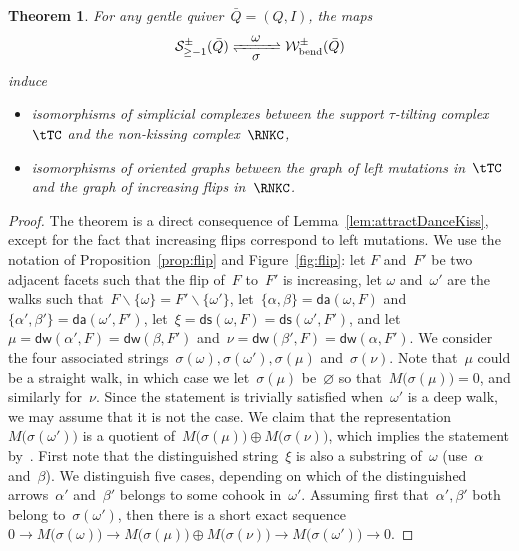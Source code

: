 \documentclass{amsart}
\newtheorem{theorem}{Theorem}[part]
\theoremstyle{definition}
\newcommand{\ssm}{\smallsetminus} %
\newcommand{\strings}{\mathcal{S}} %
\newcommand{\bendingWalks}{\mathcal{W}_\mathrm{bend}} %
\newcommand{\distinguishedWalk}[2]{\mathsf{dw}(#1,#2)} %
\newcommand{\distinguishedArrows}[2]{\mathsf{da}(#1,#2)} %
\newcommand{\distinguishedString}[2]{\mathsf{ds}(#1,#2)} %
\begin{document}
\begin{theorem}
\label{thm:nkc/sttiltc}
For any gentle quiver~$\bar Q = (Q,I)$, the maps
\[
\strings_{\ge-1}^\pm(\bar Q) \xrightleftharpoons[\quad\mbox{$\sigma$}\;\quad]{\mbox{$\omega$}} \bendingWalks^\pm(\bar Q)
\]
induce
\begin{itemize}
\item isomorphisms of simplicial complexes between the support $\tau$-tilting complex~$\tTC$ and the non-kissing complex~$\RNKC$,
\item isomorphisms of oriented graphs between the graph of left mutations in~$\tTC$ and the graph of increasing flips in~$\RNKC$.
\end{itemize}
\end{theorem}


\begin{proof}
The theorem is a direct consequence of Lemma~\ref{lem:attractDanceKiss}, except for the fact that increasing flips correspond to left mutations.
We use the notation of Proposition~\ref{prop:flip} and Figure~\ref{fig:flip}: let $F$ and~$F'$ be two adjacent facets such that the flip of~$F$ to~$F'$ is increasing, let $\omega$ and~$\omega'$ are the walks such that~$F \ssm \{\omega\} = F' \ssm \{\omega'\}$, let~$\{\alpha, \beta\} = \distinguishedArrows{\omega}{F}$ and~$\{\alpha', \beta'\} = \distinguishedArrows{\omega'}{F'}$, let~$\xi = \distinguishedString{\omega}{F} = \distinguishedString{\omega'}{F'}$, and let~$\mu = \distinguishedWalk{\alpha'}{F} = \distinguishedWalk{\beta}{F'}$ and~$\nu = \distinguishedWalk{\beta'}{F} = \distinguishedWalk{\alpha}{F'}$.
We consider the four associated strings~$\sigma(\omega), \sigma(\omega'), \sigma(\mu)$ and~$\sigma(\nu)$.
Note that~$\mu$ could be a straight walk, in which case we let~$\sigma(\mu)$ be~$\varnothing$ so that~$M \big( \sigma(\mu) \big) = 0$, and similarly for~$\nu$.
Since the statement is trivially satisfied when~$\omega'$ is a deep walk, we may assume that it is not the case.
We claim that the representation~$M \big( \sigma(\omega') \big)$ is a quotient of~$M \big( \sigma(\mu) \big) \oplus M \big( \sigma(\nu) \big)$, which implies the statement by~\cite[Def.--Prop.~2.28]{AdachiIyamaReiten}.
First note that the distinguished string~$\xi$ is also a substring of~$\omega$ (use~$\alpha$ and~$\beta$).
We distinguish five cases, depending on which of the distinguished arrows~$\alpha'$ and~$\beta'$ belongs to some cohook in~$\omega'$.
Assuming first that~$\alpha', \beta'$ both belong to~$\sigma(\omega')$, then there is a short exact sequence~$0\rightarrow M \big( \sigma(\omega) \big) \rightarrow M \big( \sigma(\mu) \big) \oplus M \big( \sigma(\nu) \big) \rightarrow M \big( \sigma(\omega') \big) \rightarrow 0$.

\end{proof}
\end{document}
